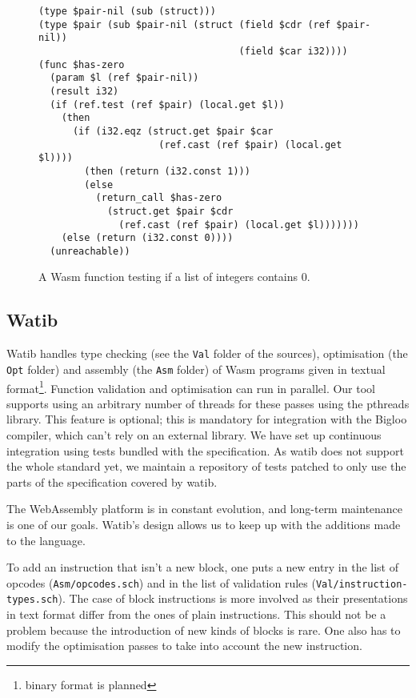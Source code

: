 \documentclass[a4paper,11pt]{article}
\begin{document}
\begin{figure}[h]
  \begin{minipage}{\widthof{(type \$pair (sub \$pair-nil (struct (field \$cdr (ref \$pair-nil))}}
\begin{lstlisting}
(type $pair-nil (sub (struct)))
(type $pair (sub $pair-nil (struct (field $cdr (ref $pair-nil))
                                   (field $car i32))))
(func $has-zero
  (param $l (ref $pair-nil))
  (result i32)
  (if (ref.test (ref $pair) (local.get $l))
    (then
      (if (i32.eqz (struct.get $pair $car
                     (ref.cast (ref $pair) (local.get $l))))
        (then (return (i32.const 1)))
        (else
          (return_call $has-zero
            (struct.get $pair $cdr
              (ref.cast (ref $pair) (local.get $l)))))))
    (else (return (i32.const 0))))
  (unreachable))
\end{lstlisting}
  \end{minipage}

  \caption{A Wasm function testing if a list of integers contains 0.}\label{ex}
\end{figure}

\subsection{Watib}
\textsf{Watib} handles type checking (see the \texttt{Val} folder of the
sources), optimisation (the \texttt{Opt} folder) and assembly (the \texttt{Asm}
folder) of Wasm programs given in textual format\footnote{binary format is
planned}. Function validation and optimisation can run in parallel. Our tool
supports using an arbitrary number of threads for these passes using the
\textsf{pthreads} library. This feature is optional; this is mandatory for
integration with the Bigloo compiler, which can't rely on an external library.
We have set up continuous integration using tests bundled with the
specification. As \textsf{watib} does not support the whole standard yet, we
maintain a repository of tests patched to only use the parts of the
specification covered by \textsf{watib}.

The WebAssembly platform is in constant evolution, and long-term maintenance is
one of our goals. \textsf{Watib}'s design allows us to keep up with the
additions made to the language.

To add an instruction that isn't a new block, one puts a new entry in the list
of opcodes (\texttt{Asm/opcodes.sch}) and in the list of validation rules
(\texttt{Val/instruction-types.sch}). The case of block instructions is more
involved as their presentations in text format differ from the ones of plain
instructions. This should not be a problem because the introduction of new kinds
of blocks is rare. One also has to modify the optimisation passes to take into
account the new instruction.
\end{document}
